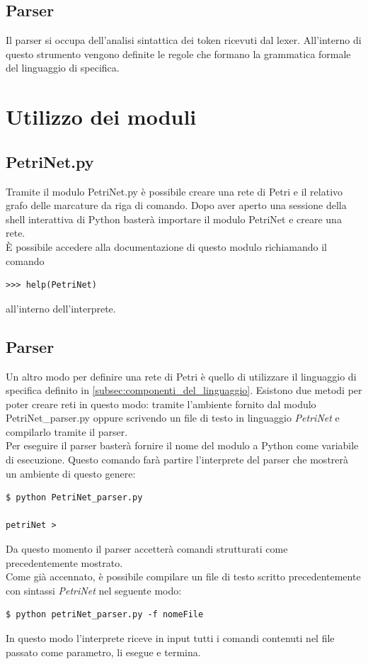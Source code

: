 \documentclass[italian,12pt]{book}
\begin{document}
\subsection{Parser}
Il parser si occupa dell'analisi sintattica dei token
ricevuti dal lexer. All'interno di questo strumento
vengono definite le regole che formano la grammatica
formale del linguaggio di specifica.
%
\section{Utilizzo dei moduli}
\subsection{PetriNet.py}
Tramite il modulo PetriNet.py è possibile creare una rete di Petri e il 
relativo grafo delle marcature da riga di comando. Dopo aver aperto una 
sessione della shell interattiva di Python basterà importare il modulo
PetriNet e creare una rete.\\
È possibile accedere alla documentazione di questo modulo richiamando il 
comando \begin{verbatim}>>> help(PetriNet)\end{verbatim} all'interno dell'interprete.
\subsection{Parser}
Un altro modo per definire una rete di Petri è quello di utilizzare il linguaggio
di specifica definito in \ref{subsec:componenti_del_linguaggio}. Esistono due 
metodi per poter creare reti in questo modo: tramite l'ambiente fornito dal
modulo PetriNet\_parser.py oppure scrivendo un file di testo in linguaggio 
\emph{PetriNet} e compilarlo tramite il parser.\\
Per eseguire il parser basterà fornire il nome del modulo a Python come 
variabile di esecuzione. Questo comando farà partire l'interprete del parser 
che mostrerà un ambiente di questo genere:
\begin{verbatim}
$ python PetriNet_parser.py 

petriNet > 
\end{verbatim} 
Da questo momento il parser accetterà comandi strutturati 
come precedentemente mostrato.\\
Come già accennato, è possibile compilare un file di testo
scritto precedentemente con sintassi \emph{PetriNet} nel seguente modo:
\begin{verbatim}
$ python petriNet_parser.py -f nomeFile
\end{verbatim}
In questo modo l'interprete riceve in input tutti i comandi 
contenuti nel file passato come parametro, li esegue e termina.
%
\end{document}
